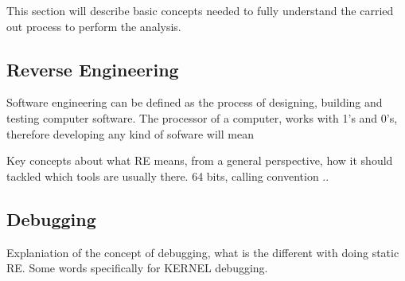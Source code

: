 This section will describe basic concepts needed to fully understand the carried out process to perform the analysis. 
\subsection{Reverse Engineering}
Software engineering can be defined as the process of designing, building and testing computer software. The processor of a computer, works with 1's and 0's, therefore developing any kind of sofware will mean 

Key concepts about what RE means, from a general perspective, how it should tackled which tools are usually there.  64 bits, calling convention .. 
\subsection{Debugging}
Explaniation of the concept of debugging, what is the different with doing static RE. Some words specifically for KERNEL debugging. 